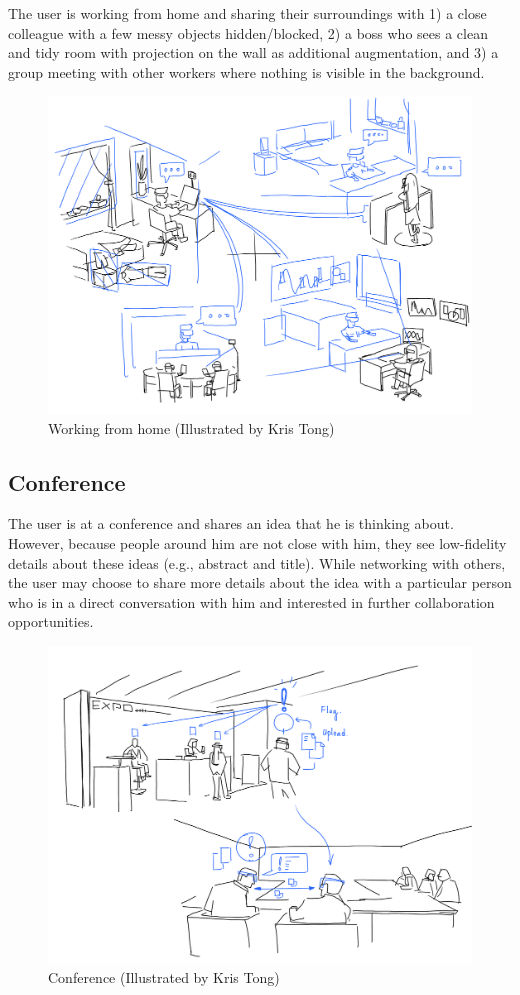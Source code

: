 The user is working from home and sharing their surroundings with 1) a close colleague with a few messy objects hidden/blocked, 2) a boss who sees a clean and tidy room with projection on the wall as additional augmentation, and 3) a group meeting with other workers where nothing is visible in the background. 

\begin{figure}[H]
    \centering
    \includegraphics[width=.8\linewidth]{images/illustrations/2_Group_Meeting.png}
    \caption{Working from home (Illustrated by Kris Tong)}
    \label{fig:illustration:group-meeting}
\end{figure}

\subsection{Conference}

The user is at a conference and shares an idea that he is thinking about. However, because people around him are not close with him, they see low-fidelity details about these ideas (e.g., abstract and title). While networking with others, the user may choose to share more details about the idea  with a particular person who is in a direct conversation with him and interested in further collaboration opportunities.

\begin{figure}[H]
    \centering
    \includegraphics[width=.8\linewidth]{images/illustrations/4_Flag_On_Conference.png}
    \caption{Conference (Illustrated by Kris Tong)}
    \label{fig:illustration:conference}
\end{figure}

